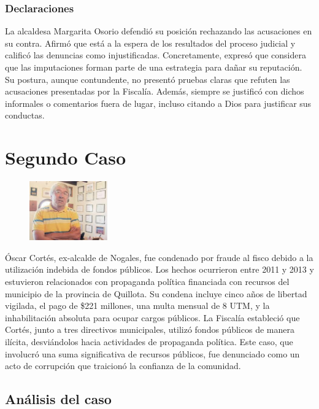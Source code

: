 \documentclass[letter,12pt]{article}
\begin{document}
	\subsubsection{Declaraciones}
	La alcaldesa Margarita Osorio defendió su posición rechazando las acusaciones en su contra. Afirmó que está a la espera de los resultados del proceso judicial y calificó las denuncias como injustificadas. Concretamente, expresó que considera que las imputaciones forman parte de una estrategia para dañar su reputación. Su postura, aunque contundente, no presentó pruebas claras que refuten las acusaciones presentadas por la Fiscalía. Además, siempre se justificó con dichos informales o comentarios fuera de lugar, incluso citando a Dios para justificar sus conductas.
	
	\section{Segundo Caso\\}
	\begin{figure}
		\centering
		\includegraphics[width=0.3\textwidth]{figures/oscar cortes}
	\end{figure}
	Óscar Cortés, ex-alcalde de Nogales, fue condenado por fraude al fisco debido a la utilización indebida de fondos públicos. Los hechos ocurrieron entre 2011 y 2013 y estuvieron relacionados con propaganda política financiada con recursos del municipio de la provincia de Quillota. Su condena incluye cinco años de libertad vigilada, el pago de \$221 millones, una multa mensual de 8 UTM, y la inhabilitación absoluta para ocupar cargos públicos.
	La Fiscalía estableció que Cortés, junto a tres directivos municipales, utilizó fondos públicos de manera ilícita, desviándolos hacia actividades de propaganda política. Este caso, que involucró una suma significativa de recursos públicos, fue denunciado como un acto de corrupción que traicionó la confianza de la comunidad.\cite{oscar1}
	
	\subsection{Análisis del caso\\}
\end{document}
